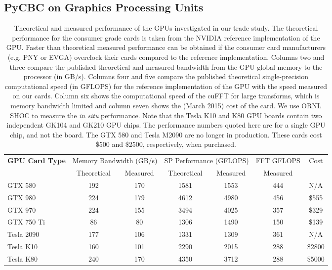 \vspace*{-10pt}
\subsection{PyCBC on Graphics Processing Units}
\vspace*{-05pt}
\label{sec:gpu-trade}

\begin{table}[!b]
\centering
{\small
\begin{tabular}{|l|c|c|c|c|c|c|}
\hline 
{\bf GPU Card Type}  & \multicolumn{2}{c|}{Memory Bandwidth (GB/s)} & \multicolumn{2}{c|}{SP Performance (GFLOPS)} & FFT GFLOPS & Cost \\
                     & Theoretical & Measured & Theoretical & Measured & Measured &  \\\hline
GTX 580 & 192 & 170 & 1581 & 1553 & 444 & N/A \\
GTX 980 & 224 & 179 & 4612 & 4980 & 456 & \$555\\
GTX 970 & 224 & 155 & 3494 & 4025 & 357 & \$329 \\
GTX 750 Ti & 86 & 80 & 1306 & 1490 & 150 & \$139 \\
Tesla 2090 & 177 & 106 & 1331 & 1309 & 361 & N/A \\
Tesla K10 & 160 & 101 & 2290 & 2015 & 288 & \$2800 \\
Tesla K80 & 240 & 170 & 4350 & 3712 & 288 & \$5000 \\\hline
\end{tabular}
}
\caption{\label{tab:gpu-test-stand}
Theoretical and measured performance of the GPUs investigated in our trade
study. The theoretical performance for the consumer grade cards is
taken from the NVIDIA reference implementation of the GPU. Faster than
theoretical measured performance can be obtained if the consumer card
manufacturers (e.g.  PNY or EVGA) overclock their cards compared to the
reference implementation. Columns two and three compare the published
theoretical and measured bandwidth from the GPU global memory to the processor
(in GB/s).  Columns four and five compare the published theoretical
single-precision computational speed (in GFLOPS) for the reference
implementation of the GPU with the speed measured on our cards.  Column six
shows the computational speed of the cuFFT for large transforms, which is
memory bandwidth limited and column seven shows the (March 2015) cost of the
card. We use ORNL SHOC to measure the \emph{in situ} performance. Note that
the Tesla K10 and K80 GPU boards contain two independent GK104 and GK210 GPU
chips. The performance numbers quoted here are for a single GPU chip, and not
the board. The GTX 580 and Tesla M2090 are no longer in production. These
cards cost \$500 and \$2500, respectively, when purchased.
}
\end{table}

